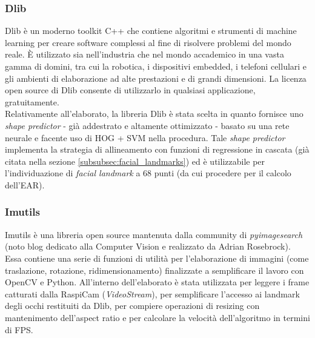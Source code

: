 \documentclass[12pt]{article}
\begin{document}
\subsubsection{Dlib}
\label{subsec:dlib}
Dlib\cite{Dlib} è un moderno toolkit C++ che contiene algoritmi e strumenti di machine learning per creare software complessi al fine di risolvere problemi del mondo reale. È utilizzato sia nell'industria che nel mondo accademico in una vasta gamma di domini, tra cui la robotica, i dispositivi embedded, i telefoni cellulari e gli ambienti di elaborazione ad alte prestazioni e di grandi dimensioni. La licenza open source di Dlib consente di utilizzarlo in qualsiasi applicazione, gratuitamente.\\
Relativamente all'elaborato, la libreria Dlib è stata scelta in quanto fornisce uno \textit{shape predictor}\cite{DlibShapePredictor} - già addestrato e altamente ottimizzato - basato su una rete neurale e facente uso di HOG + SVM nella procedura. Tale \textit{shape predictor} implementa la strategia di allineamento con funzioni di regressione in cascata (già citata nella sezione \ref{subsubsec:facial_landmarks}) ed è utilizzabile per l'individuazione di \textit{facial landmark} a 68 punti (da cui procedere per il calcolo dell'EAR).

\subsubsection{Imutils}
\label{subsec:imutils}
Imutils\cite{Imutils} è una libreria open source mantenuta dalla community di \textit{pyimagesearch}\cite{Pyimagesearch} (noto blog dedicato alla Computer Vision e realizzato da Adrian Rosebrock). Essa contiene una serie di funzioni di utilità per l'elaborazione di immagini (come traslazione, rotazione, ridimensionamento) finalizzate a semplificare il lavoro con OpenCV e Python. All'interno dell'elaborato è stata utilizzata per leggere i frame catturati dalla RaspiCam (\textit{VideoStream}), per semplificare l'accesso ai landmark degli occhi restituiti da Dlib, per compiere operazioni di resizing con mantenimento dell'aspect ratio e per calcolare la velocità dell'algoritmo in termini di FPS.
\end{document}
